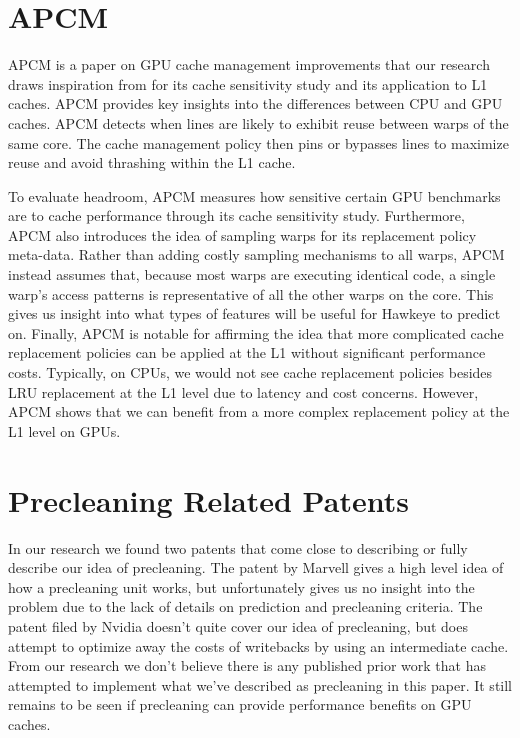 \section{APCM}
APCM is a paper on GPU cache management improvements that our research draws inspiration from for its cache sensitivity study and its application to L1 caches. APCM provides key insights into the differences between CPU and GPU caches. APCM detects when lines are likely to exhibit reuse between warps of the same core. The cache management policy then pins or bypasses lines to maximize reuse and avoid thrashing within the L1 cache.

To evaluate headroom, APCM measures how sensitive certain GPU benchmarks are to cache performance through its cache sensitivity study. Furthermore, APCM also introduces the idea of sampling warps for its replacement policy meta-data. Rather than adding costly sampling mechanisms to all warps, APCM instead assumes that, because most warps are executing identical code, a single warp's access patterns is representative of all the other warps on the core. This gives us insight into what types of features will be useful for Hawkeye to predict on. Finally, APCM is notable for affirming the idea that more complicated cache replacement policies can be applied at the L1 without significant performance costs. Typically, on CPUs, we would not see cache replacement policies besides LRU replacement at the L1 level due to latency and cost concerns. However, APCM shows that we can benefit from a more complex replacement policy at the L1 level on GPUs.

\section{Precleaning Related Patents}
In our research we found two patents that come close to describing or fully describe our idea of precleaning. The patent by Marvell \cite{preclean_cpu} gives a high level idea of how a precleaning unit works, but unfortunately gives us no insight into the problem due to the lack of details on prediction and precleaning criteria. The patent filed by Nvidia \cite{preclean_nvidia_patent} doesn't quite cover our idea of precleaning, but does attempt to optimize away the costs of writebacks by using an intermediate cache. From our research we don't believe there is any published prior work that has attempted to implement what we've described as precleaning in this paper. It still remains to be seen if precleaning can provide performance benefits on GPU caches.
